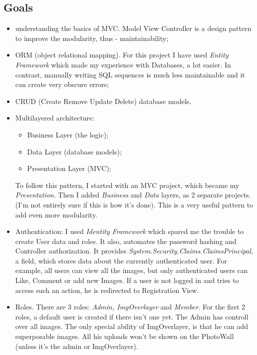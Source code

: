 \documentclass{article}
\begin{document}
		\subsection{Goals}
			\begin{itemize}
				\item understanding the basics of MVC. Model View Controller is a design pattern to improve the modularity, thus - maintainability;
				\item ORM (object relational mapping). For this project I have used \textit{Entity Framework} which made my experience with Databases, a lot easier. In contrast, manually writing SQL sequences is much less maintainable and it can create very obscure errors;

				\item CRUD (Create Remove Update Delete) database models.
				
				\item Multilayered architecture:
					\begin{itemize}
						\item Business Layer (the logic);
						\item Data Layer (database models);
						\item Presentation Layer (MVC);
					\end{itemize}
					To follow this pattern, I started with an MVC project, which became my \textit{Presentation}. Then I added \textit{Business} and \textit{Data} layers, as 2 separate projects. (I'm not entirely sure if this is how it's done). This is a very useful pattern to add even more modularity.

				\item Authentication: I used \textit{Identity Framework} which spared me the trouble to create User data and roles. It also, automates the password hashing and Controller authorization. It provides \textit{System.Security.Claims.ClaimsPrincipal}, a field, which stores data about the currently authenticated user. For example, all users can view all the images, but only authenticated users can Like, Comment or add new Images. If a user is not logged in and tries to access such an action, he is redirected to Registration View.

				\item Roles. There are 3 roles: \textit{Admin, ImgOverlayer} and \textit{Member}. For the first 2 roles, a default user is created if there isn't one yet. The Admin has controll over all images. The only special ability of ImgOverlayer, is that he can add superposable images. All his uploads won't be shown on the PhotoWall (unless it's the admin or ImgOverlayer).
			\end{itemize}
\end{document}
